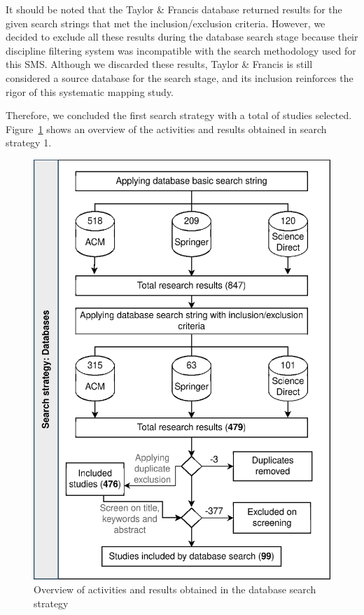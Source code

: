 It should be noted that the Taylor \& Francis database returned results for the given search strings that met the inclusion/exclusion criteria. However, we decided to exclude all these results during the database search stage because their discipline filtering system was incompatible with the search methodology used for this SMS. Although we discarded these results, Taylor \& Francis is still considered a source database for the search stage, and its inclusion reinforces the rigor of this systematic mapping study.


Therefore, we concluded the first search strategy with a total of \screenTot{} studies selected. Figure~\ref{fig:overview} shows an overview of the activities and results obtained in search strategy 1.

\begin{figure}
	\centering
	\includegraphics[scale=0.6]{resources/figures/sms-overview.eps}
	\caption{Overview of activities and results obtained in the database search strategy}
	\label{fig:overview}
\end{figure}


